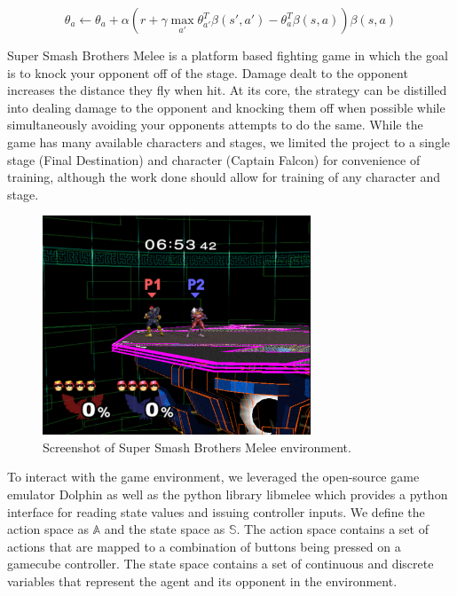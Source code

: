 \begin{equation}
	\theta_a \leftarrow \theta_a+\alpha(r + \gamma \max_{a'} \theta_{a'}^T\beta(s',a') -  \theta_{a}^T\beta(s,a))\beta(s,a)
\end{equation}

Super Smash Brothers Melee is a platform based fighting game in which the goal is to knock your opponent off of the stage. Damage dealt to the opponent increases the distance they fly when hit. At its core, the strategy can be distilled into dealing damage to the opponent and knocking them off when possible while simultaneously avoiding your opponents attempts to do the same. While the game has many available characters and stages, we limited the project to a single stage (Final Destination) and character (Captain Falcon) for convenience of training, although the work done should allow for training of any character and stage.

\begin{figure}[!htb]
\centering
	\includegraphics[width=80mm]{stage.png}
	\caption{Screenshot of Super Smash Brothers Melee environment. \label{melee}}
\end{figure}

To interact with the game environment, we leveraged the open-source game emulator Dolphin as well as the python library libmelee which provides a python interface for reading state values and issuing controller inputs. We define the action space as $\mathbb{A}$ and the state space as $\mathbb{S}$. The action space contains a set of actions that are mapped to a combination of buttons being pressed on a gamecube controller. The state space contains a set of continuous and discrete variables that represent the agent and its opponent in the environment.





